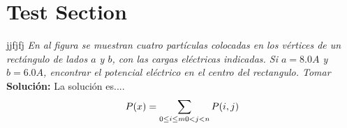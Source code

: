 \documentclass{article}
\begin{document}
\section{Test Section}

\begin{Example}{jjfjfj}
\emph{En al figura se muestran cuatro partículas colocadas en los vértices de un rectángulo de lados $a$ y $b$, con las cargas eléctricas indicadas. Si $a=8.0 A$ y $b=6.0 A$, encontrar el potencial el\'ectrico en el centro del rectangulo. Tomar}
\newline
{\bf{\large{Soluci\'on:}}}
\newline
La soluci\'on es....
\begin{equation}
P(x)=\sum_{0\le i\le m\\0<j<n}P(i, j)
\end{equation}
\lipsum[1]
\end{Example}
\end{document}
